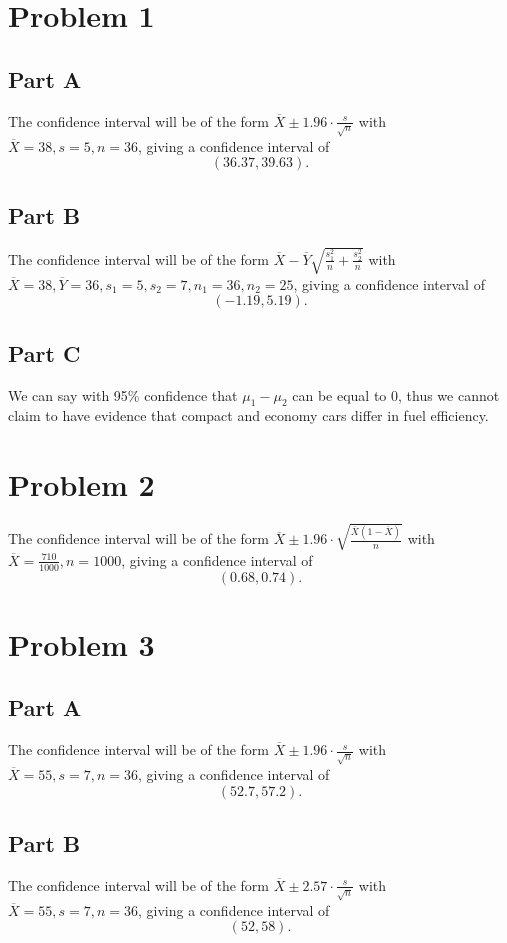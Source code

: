 \documentclass[12pt]{extarticle}
\begin{document}
\section*{Problem 1}
\subsection*{Part A}
The confidence interval will be of the form $\overline{X} \pm 1.96\cdot\frac{s}{\sqrt{n}}$ with $\overline{X} = 38, s = 5, n = 36$, giving a confidence interval of
\[
	(36.37, 39.63)
.\]

\subsection*{Part B}
The confidence interval will be of the form $\overline{X} - \overline{Y} \sqrt{\frac{s_1^2}{n} + \frac{s_2^2}{n}}$ with $\overline{X} = 38, \overline{Y} = 36, s_1 = 5, s_2 = 7, n_1 = 36, n_2 = 25$, giving a confidence interval of
\[
	(-1.19, 5.19)
.\]

\subsection*{Part C}
We can say with 95\% confidence that $\mu_1 - \mu_2$ can be equal to $0$, thus we cannot claim to have evidence that compact and economy cars differ in fuel efficiency.

\section*{Problem 2}
The confidence interval will be of the form $\overline{X} \pm 1.96 \cdot\sqrt{\frac{\overline{X} (1 - \overline{X})}{n}}$ with $\overline{X} = \frac{710}{1000}, n = 1000$, giving a confidence interval of
\[
	(0.68, 0.74)
.\]

\section*{Problem 3}
\subsection*{Part A}
The confidence interval will be of the form $\overline{X} \pm 1.96 \cdot \frac{s}{\sqrt{n}}$ with $\overline{X} = 55, s = 7, n = 36$, giving a confidence interval of
\[
	(52.7, 57.2)
.\]

\subsection*{Part B}
The confidence interval will be of the form $\overline{X} \pm 2.57 \cdot \frac{s}{\sqrt{n}}$ with $\overline{X} = 55, s = 7, n = 36$, giving a confidence interval of
\[
	(52, 58)
.\]
\end{document}

